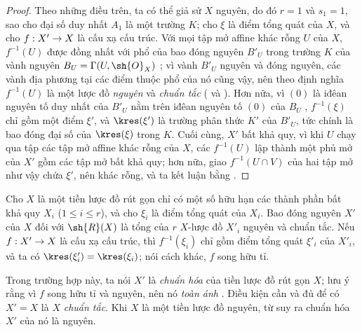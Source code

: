 \documentclass[oneside,10pt]{amsart}
\makeatletter
\renewcommand{\leq}{\leqslant}
\newcommand{\ega@arrow}[2]{\mathchoice{#1}{#2}{#2}{#2}}
\renewcommand{\to}{\ega@arrow{\longrightarrow}{\rightarrow}}
\let\EGAOriginalLabel\label
\renewcommand{\label}[1]{\phantomsection\EGAOriginalLabel{#1}}
\makeatother
\begin{document}
\begin{proof}
Theo những điều trên, ta có thể giả sử $X$ nguyên, do đó $r=1$ và $s_1=1$, sao cho đại số duy nhất $A_1$ là một trường $K$;
cho $\xi$ là điểm tổng quát của $X$, và cho $f:X'\to X$ là cấu xạ cấu trúc.
Với mọi tập mở affine khác rỗng $U$ của $X$, $f^{-1}(U)$ được đồng nhất với phổ của bao đóng nguyên $B'_U$ trong trường $K$ của vành nguyên $B_U=\Gamma(U,\sh{O}_X)$ ;
vì vành $B'_U$ nguyên và đóng nguyên, các vành địa phương tại các điểm thuộc phổ của nó cũng vậy, nên theo định nghĩa $f^{-1}(U)$ là một lược đồ \emph{nguyên} và \emph{chuẩn tắc} ( và ).
Hơn nữa, vì $(0)$ là iđêan nguyên tố duy nhất của $B'_U$ nằm trên iđêan nguyên tố $(0)$ của $B_U$ \cite[t.~I, p.~259]{I-13}, $f^{-1}(\xi)$ chỉ gồm một điểm $\xi'$, và $\kres(\xi')$ là trường phân thức $K'$ của $B'_U$, tức chính là bao đóng đại số của $\kres(\xi)$ trong $K$.
Cuối cùng, $X'$ bất khả quy, vì khi $U$ chạy qua tập các tập mở affine khác rỗng của $X$, các $f^{-1}(U)$ lập thành một phủ mở của $X'$ gồm các tập mở bất khả quy;
hơn nữa, giao $f^{-1}(U\cap V)$ của hai tập mở như vậy chứa $\xi'$, nên khác rỗng, và ta kết luận bằng .
\end{proof}

\begin{corollary}[6.3.8]
\label{II.6.3.8}
Cho $X$ là một tiền lược đồ rút gọn chỉ có một số hữu hạn các thành phần bất khả quy $X_i$ ($1\leq i\leq r$), và cho $\xi_i$ là điểm tổng quát của $X_i$.
Bao đóng nguyên $X'$ của $X$ đối với $\sh{R}(X)$ là tổng của $r$ $X$-lược đồ $X'_i$ nguyên và chuẩn tắc.
Nếu $f:X'\to X$ là cấu xạ cấu trúc, thì $f^{-1}(\xi_i)$ chỉ gồm điểm tổng quát $\xi'_i$ của $X'_i$, và ta có $\kres(\xi'_i)=\kres(\xi_i)$; nói cách khác, $f$ song hữu tỉ.
\end{corollary}

Trong trường hợp này, ta nói $X'$ là \emph{chuẩn hóa} của tiền lược đồ rút gọn $X$;
lưu ý rằng vì $f$ song hữu tỉ và nguyên, nên nó \emph{toàn ánh} .
Điều kiện cần và đủ để có $X'=X$ là $X$ \emph{chuẩn tắc}.
Khi $X$ là một tiền lược đồ nguyên, từ  suy ra chuẩn hóa $X'$ của nó là nguyên.
\end{document}

